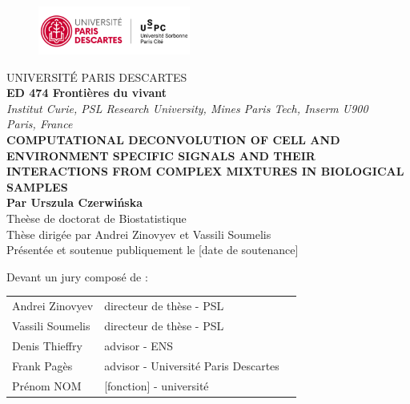 \documentclass[12pt,]{book}
\title{}
\author{}
\date{}
\theoremstyle{definition}
\theoremstyle{definition}
\theoremstyle{definition}
\theoremstyle{remark}
\begin{document}
\begin{titlepage}
\frontmatter
\begin{figure}[t]
\includegraphics[width=5cm]{figures-ext/LogoParisDescartes}
\end{figure}
\begin{center}
UNIVERSITÉ PARIS DESCARTES \\
\vspace*{1cm}
\textbf{ED 474 Frontières du vivant}\\
\vspace*{0,5cm}
\textit{Institut Curie, PSL Research University, Mines Paris Tech, Inserm U900 \\Paris, France}\\
\vspace*{1cm}
\LARGE{\textbf{COMPUTATIONAL DECONVOLUTION OF CELL AND ENVIRONMENT SPECIFIC SIGNALS AND
THEIR INTERACTIONS FROM COMPLEX MIXTURES IN BIOLOGICAL SAMPLES}}\\
\large{\textbf{Par Urszula Czerwińska}}\\
\vspace*{1cm}
Theèse de doctorat de Biostatistique\\
\vspace*{1cm}
Thèse dirigée par Andrei Zinovyev et Vassili Soumelis\\
\vspace*{1cm}
\small{Présentée et soutenue publiquement le [date de soutenance]}\\
\end{center}
\vspace*{1cm}
\begin{footnotesize}
Devant un jury composé de : \\
\begin{tabular}{lll}
Andrei Zinovyev & directeur de thèse - PSL\\
Vassili Soumelis & directeur de thèse - PSL\\
Denis Thieffry & advisor - ENS\\
Frank Pagès & advisor - Université Paris Descartes\\
Prénom NOM & [fonction] - université\\

\end{tabular}
\end{footnotesize}


\end{titlepage}
\end{document}
